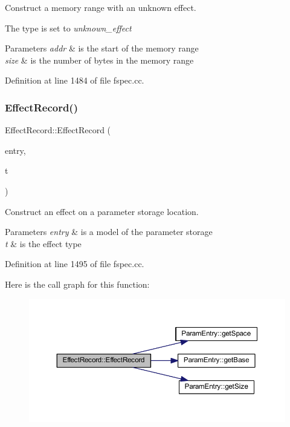 Construct a memory range with an unknown effect. 

The type is set to {\itshape unknown\+\_\+effect} 
\begin{DoxyParams}{Parameters}
{\em addr} & is the start of the memory range \\
\hline
{\em size} & is the number of bytes in the memory range \\
\hline
\end{DoxyParams}


Definition at line 1484 of file fspec.\+cc.

\mbox{\label{class_effect_record_ab660482ee12ca9bf6c341c004f161b3f}} 
\subsubsection{\texorpdfstring{EffectRecord()}{EffectRecord()}\hspace{0.1cm}{\footnotesize\ttfamily [4/5]}}
{\footnotesize\ttfamily Effect\+Record\+::\+Effect\+Record (\begin{DoxyParamCaption}\item[{const \mbox{\hyperlink{class_param_entry}{Param\+Entry}} \&}]{entry,  }\item[{uint4}]{t }\end{DoxyParamCaption})}



Construct an effect on a parameter storage location. 


\begin{DoxyParams}{Parameters}
{\em entry} & is a model of the parameter storage \\
\hline
{\em t} & is the effect type \\
\hline
\end{DoxyParams}


Definition at line 1495 of file fspec.\+cc.

Here is the call graph for this function\+:
\nopagebreak
\begin{figure}[H]
\begin{center}
\leavevmode
\includegraphics[width=350pt]{class_effect_record_ab660482ee12ca9bf6c341c004f161b3f_cgraph}
\end{center}
\end{figure}
\mbox{\label{class_effect_record_a7404377ab3098d76448992abb3785666}} 
